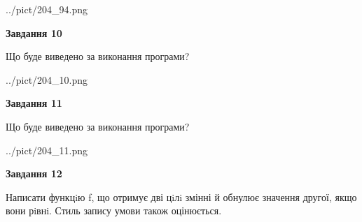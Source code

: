 \documentclass[12pt, ukrainian]{article}
\begin{document}
{\begin {large}
\begin{center}
	{../pict/204_94.png}
\end{center}
\newpage

{\begin {center}\textbf{Завдання 10}\end {center}}

Що буде виведено за виконання програми?\par
\begin{center}
	{../pict/204_10.png}
\end{center}
\newpage

{\begin {center}\textbf{Завдання 11}\end {center}}

Що буде виведено за виконання програми?\par
\begin{center}
	{../pict/204_11.png}
\end{center}
\newpage

{\begin {center}\textbf{Завдання 12}\end {center}}


Написати функцiю f, що отримує дві цiлi змінні й обнулює значення другої, якщо вони рiвнi. Стиль запису умови також оцінюється.\par
\newpage

\end {large}}
\end{document}
